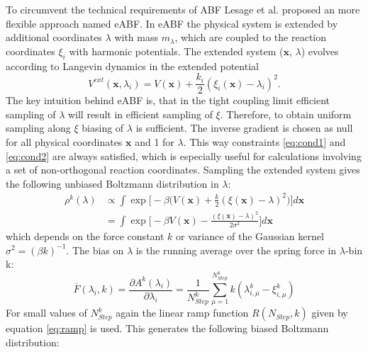 To circumvent the technical requirements of ABF Lesage et al.\autocite{lesage2017smoothed} proposed an more flexible approach named eABF.
In eABF the physical system is extended by additional coordinates $\lambda$ with mass $m_{\lambda}$, which are coupled to the reaction coordinates $\xi_i$ with harmonic potentials. The extended system ($\textbf{x}$, $\lambda$) evolves according to Langevin dynamics in the extended potential
\begin{equation}
  V^{ext}(\textbf{x},\lambda_i) = V(\textbf{x}) + \frac{k_i}{2}(\xi_{i}(\textbf{x})-\lambda_i)^2.
\end{equation}
The key intuition behind eABF is, that in the tight coupling limit efficient sampling of $\lambda$ will result in efficient sampling of $\xi$. Therefore, to obtain uniform sampling along $\xi$ biasing of $\lambda$ is sufficient. The inverse gradient is chosen as null for all physical coordinates $\textbf{x}$ and 1 for $\lambda$. This way constraints \ref{eq:cond1} and \ref{eq:cond2} are always satisfied, which is especially useful for calculations involving a set of non-orthogonal reaction coordinates.
Sampling the extended system gives the following unbiased Boltzmann distribution in $\lambda$:
\begin{equation}
\begin{aligned}
  \rho^k(\lambda) &\propto
  \int \exp \biggl[-\beta \biggl(V(\textbf{x})+\frac{k}{2}(\xi(\textbf{x})-\lambda)^2 \biggr) \biggr] d\textbf{x} \\
  &= \int \exp \biggl[-\beta V(\textbf{x}) - \frac{(\xi(\textbf{x})-\lambda)^2}{2\sigma^2} \biggr] d\textbf{x}
\end{aligned}
\end{equation}
which depends on the force constant $k$ or variance of the Gaussian kernel $\sigma^2=(\beta k)^{-1}$.
The bias on $\lambda$ is the running average over the spring force in $\lambda$-bin k:
\begin{equation}
  \overline{F}(\lambda_{i}, k) = \frac{\partial A^{k}(\lambda_{i})}{\partial \lambda_i} = \frac{1}{N_{Step}^{k}} \sum_{\mu=1}^{N_{Step}^{k}} k(\lambda_{i,\mu}^{k}-\xi_{i,\mu}^{k})
\end{equation}
For small values of $N_{Step}^{k}$ again the linear ramp function $R(N_{Step},k)$ given by equation \ref{eq:ramp} is used. This generates the following biased Boltzmann distribution:
